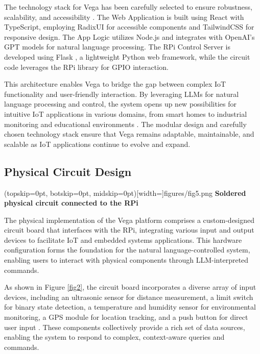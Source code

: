 \documentclass{ieeeaccess}
\begin{document}
The technology stack for Vega has been carefully selected to ensure robustness, scalability, and accessibility \cite{math9040308}. The Web Application is built using React \cite{React2024} with TypeScript, employing RadixUI \cite{radix-ui} for accessible components and TailwindCSS \cite{tailwindcss} for responsive design. The App Logic utilizes Node.js and integrates with OpenAI's GPT models \cite{OpenAI_GPT} for natural language processing. The RPi Control Server is developed using Flask \cite{Flask2024}, a lightweight Python web framework, while the circuit code leverages the RPi library for GPIO interaction.

This architecture enables Vega to bridge the gap between complex IoT functionality and user-friendly interaction. By leveraging LLMs for natural language processing and control, the system opens up new possibilities for intuitive IoT applications in various domains, from smart homes to industrial monitoring and educational environments \cite{8067944}. The modular design and carefully chosen technology stack ensure that Vega remains adaptable, maintainable, and scalable as IoT applications continue to evolve and expand.

\subsection{Physical Circuit Design}

\Figure[t!](topskip=0pt, botskip=0pt,
midskip=0pt)[width=\textwidth]{{figures/fig5.png}}
{ \textbf{Soldered physical circuit connected to the RPi}\label{fig2}}

The physical implementation of the Vega platform comprises a custom-designed circuit board that interfaces with the RPi, integrating various input and output devices to facilitate IoT and embedded systems applications. This hardware configuration forms the foundation for the natural language-controlled system, enabling users to interact with physical components through LLM-interpreted commands.

As shown in Figure \ref{fig2}, the circuit board incorporates a diverse array of input devices, including an ultrasonic sensor for distance measurement, a limit switch for binary state detection, a temperature and humidity sensor for environmental monitoring, a GPS module for location tracking, and a push button for direct user input \cite{electronicwings_sensors_modules}. These components collectively provide a rich set of data sources, enabling the system to respond to complex, context-aware queries and commands.
\end{document}
